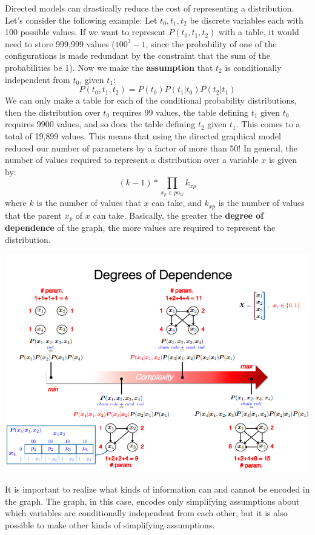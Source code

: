Directed models can drastically reduce the cost of representing a distribution. Let's consider the following example:\newline\newline
Let $t_0, t_1, t_2$ be discrete variables each with 100 possible values. If we want to represent $P(t_0, t_1, t_2)$ with a table, it would need to store 999,999 values ($100^3 - 1$, since the probability of one of the configurations is made redundant by the constraint that the sum of the probabilities be 1). Now we make the \textbf{assumption} that $t_2$ is conditionally independent from $t_0$, given $t_1$:
\[P(t_0, t_1, t_2) = P(t_0)P(t_1 | t_0)P(t_2 | t_1)\]
We can only make a table for each of the conditional probability distributions, then the distribution over $t_0$ requires 99 values, the table defining $t_1$ given $t_0$ requires 9900 values, and so does the table defining $t_2$ given $t_1$. This comes to a total of 19,899 values. This means that using the directed graphical model reduced our number of parameters by a factor of more than 50!\newline\newline
In general, the number of values required to represent a distribution over a variable $x$ is given by:
\[(k - 1) * \prod_{x_p \in pa_{G}}k_{xp}\]
where $k$ is the number of values that $x$ can take, and $k_{xp}$ is the number of values that the parent $x_p$ of $x$ can take.\newline\newline
Basically, the greater the \textbf{degree of dependence} of the graph, the more values are required to represent the distribution.
\begin{center}
    \includegraphics[scale=0.8]{images/degree of dependence.png}
\end{center}
It is important to realize what kinds of information can and cannot be encoded in the graph. The graph, in this case, encodes only simplifying assumptions about which variables are conditionally independent from each other, but it is also possible to make other kinds of simplifying assumptions.

